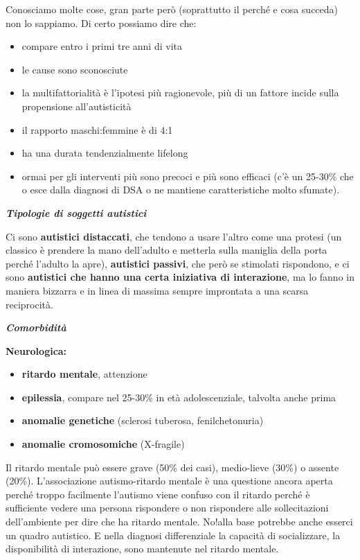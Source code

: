 \documentclass[]{article}
\begin{document}
Conosciamo molte cose, gran parte però (soprattutto il perché e cosa
succeda) non lo sappiamo. Di certo possiamo dire che:

\begin{itemize}
\item
  compare entro i primi tre anni di vita
\item
  le cause sono sconosciute
\item
  la multifattorialità è l'ipotesi più ragionevole, più di un fattore
  incide sulla propensione all'autisticità
\item
  il rapporto maschi:femmine è di 4:1
\item
  ha una durata tendenzialmente lifelong
\item
  ormai per gli interventi più sono precoci e più sono efficaci (c'è un
  25-30\% che o esce dalla diagnosi di DSA o ne mantiene caratteristiche
  molto sfumate).
\end{itemize}

\emph{\textbf{Tipologie di soggetti autistici}}

Ci sono \textbf{autistici distaccati}, che tendono a usare l'altro come
una protesi (un classico è prendere la mano dell'adulto e metterla sulla
maniglia della porta perché l'adulto la apre), \textbf{autistici
passivi}, che però se stimolati rispondono, e ci sono \textbf{autistici
che hanno una certa iniziativa di interazione}, ma lo fanno in maniera
bizzarra e in linea di massima sempre improntata a una scarsa
reciprocità.

\emph{\textbf{Comorbidità}}

\textbf{Neurologica:}

\begin{itemize}
\item
  \textbf{ritardo mentale}, attenzione
\item
  \textbf{epilessia}, compare nel 25-30\% in età adolescenziale,
  talvolta anche prima
\item
  \textbf{anomalie genetiche} (sclerosi tuberosa, fenilchetonuria)
\item
  \textbf{anomalie cromosomiche} (X-fragile)
\end{itemize}

Il ritardo mentale può essere grave (50\% dei casi), medio-lieve (30\%)
o assente (20\%). L'associazione autismo-ritardo mentale è una questione
ancora aperta perché troppo facilmente l'autismo viene confuso con il
ritardo perché è sufficiente vedere una persona rispondere o non
rispondere alle sollecitazioni dell'ambiente per dire che ha ritardo
mentale. No!alla base potrebbe anche esserci un quadro autistico. E
nella diagnosi differenziale la capacità di socializzare, la
disponibilità di interazione, sono mantenute nel ritardo mentale.
\end{document}
